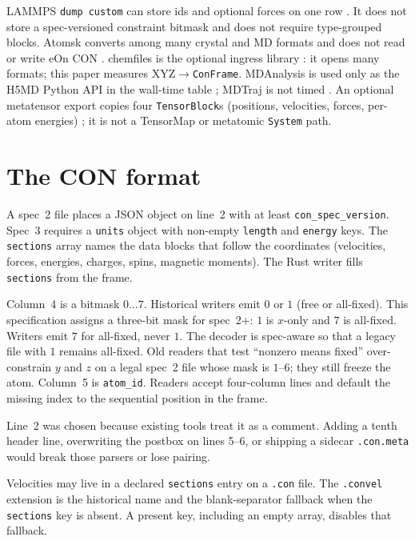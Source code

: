 \documentclass[preprint,12pt]{elsarticle}
\begin{document}
LAMMPS \texttt{dump custom} can store ids and optional forces on one
row \cite{thompsonLammpsFlexibleSimulation2022}. It does not store a
spec-versioned constraint bitmask and does not require type-grouped
blocks. Atomsk converts among many crystal and MD formats and does
not read or write eOn CON \cite{hirelAtomskToolManipulating2015}.
chemfiles is the optional ingress library
\cite{frauxChemfiles2023}: it opens many formats; this paper
measures XYZ$\to$\texttt{ConFrame}. MDAnalysis is used only as the
H5MD Python API in the wall-time table
\cite{michaudAgrawalMDAnalysisToolkit2011,gowersMDAnalysisPythonPackage2016};
MDTraj is not timed \cite{mcgibbonMDTrajModernOpen2015}.
An optional metatensor export copies four \texttt{TensorBlock}s
(positions, velocities, forces, per-atom energies)
\cite{bigiMetatensorMetatomicFoundational2026}; it is not a
TensorMap or metatomic \texttt{System} path.

\section{The CON format}

A spec~2 file places a JSON object on line~2 with at least
\texttt{con\_spec\_version}. Spec~3 requires a \texttt{units} object
with non-empty \texttt{length} and \texttt{energy} keys. The
\texttt{sections} array names the data blocks that follow the
coordinates (velocities, forces, energies, charges, spins, magnetic
moments). The Rust writer fills \texttt{sections} from the frame.

Column~4 is a bitmask $0\ldots 7$. Historical writers emit $0$ or
$1$ (free or all-fixed). This specification assigns a three-bit
mask for spec~2+: $1$ is $x$-only and $7$ is all-fixed. Writers
emit $7$ for all-fixed, never $1$. The decoder is spec-aware so
that a legacy file with $1$ remains all-fixed. Old readers that
test ``nonzero means fixed'' over-constrain $y$ and $z$ on a legal
spec~2 file whose mask is $1$--$6$; they still freeze the atom.
Column~5 is \texttt{atom\_id}. Readers accept four-column lines and
default the missing index to the sequential position in the frame.

Line~2 was chosen because existing tools treat it as a comment.
Adding a tenth header line, overwriting the postbox on lines 5--6, or
shipping a sidecar \texttt{.con.meta} would break those parsers or
lose pairing.

Velocities may live in a declared \texttt{sections} entry on a
\texttt{.con} file. The \texttt{.convel} extension is the historical
name and the blank-separator fallback when the \texttt{sections} key
is absent. A present key, including an empty array, disables that
fallback.
\end{document}
